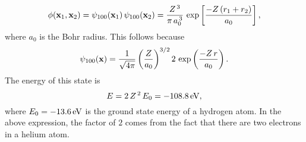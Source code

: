 \begin{equation}\label{e10.57t}
\phi({\bf x}_1,{\bf x}_2) =\psi_{100}({\bf x}_1)\,\psi_{100}({\bf x}_2)= \frac{Z^{\,3}}{\pi\,a_0^{\,3}}\,\exp\left[\frac{-Z\,(r_1+r_2)}{a_0}\right],
\end{equation}
where  $a_0$ is the Bohr radius. This follows because
\begin{equation}
\psi_{100}({\bf x})= \frac{1}{\sqrt{4\pi}}\left(\frac{Z}{a_0}\right)^{3/2}2\,\exp\left(\frac{-Z\,r}{a_0}\right).
\end{equation}
The energy of this state
is
\begin{equation}
E = 2\,Z^{\,2}\,E_0=-108.8\,{\rm eV},
\end{equation}
where $E_0=-13.6\,{\rm eV}$ is the ground state energy of a hydrogen atom. In the above expression, the factor of $2$ comes from the fact that
there are two electrons in a helium atom. 

